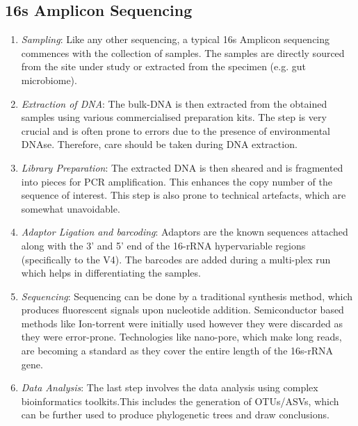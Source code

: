 \subsection{16s Amplicon Sequencing}

\begin{enumerate}
  \item \textit{Sampling}: Like any other sequencing, a typical 16s Amplicon sequencing commences with the collection of samples. The samples are directly sourced from the site under study or extracted from the specimen (e.g. gut microbiome).
  \item \textit{Extraction of DNA}: The bulk-DNA is then extracted from the obtained samples using various commercialised preparation kits. The step is very crucial and is often prone to errors due to the presence of environmental DNAse. Therefore, care should be taken during DNA extraction.
  \item \textit{Library Preparation}: The extracted DNA is then sheared and is fragmented into pieces for PCR amplification. This enhances the copy number of the sequence of interest. This step is also prone to technical artefacts, which are somewhat unavoidable. 
  \item \textit{Adaptor Ligation and barcoding}: Adaptors are the known sequences attached along with the 3' and 5' end of the 16-rRNA hypervariable regions (specifically to the V4). The barcodes are added during a multi-plex run which helps in differentiating the samples.
  \item \textit{Sequencing}: Sequencing can be done by a traditional synthesis method, which produces fluorescent signals upon nucleotide addition. Semiconductor based methods like Ion-torrent were initially used however they were discarded as they were error-prone. Technologies like nano-pore, which make long reads, are becoming a standard as they cover the entire length of the 16s-rRNA gene.
  \item \textit{Data Analysis}: The last step involves the data analysis using complex bioinformatics toolkits.This includes the generation of OTUs/ASVs, which can be further used to produce phylogenetic trees and draw conclusions.
\end{enumerate}

